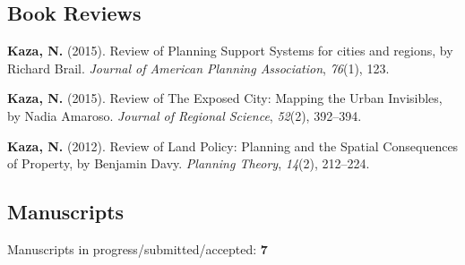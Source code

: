 \documentclass[11pt,a4paper,]{awesome-cv}
\newlength{\cslhangindent}
\newenvironment{CSLReferences}[2] %
 {\begin{list}{}{%
  \setlength{\itemindent}{0pt}
  \setlength{\leftmargin}{0pt}
  \setlength{\parsep}{0pt}
  \ifodd #1
   \setlength{\leftmargin}{\cslhangindent}
   \setlength{\itemindent}{-1\cslhangindent}
  \fi
  \setlength{\itemsep}{#2\baselineskip}}}
 {\end{list}}
\begin{document}
\subsection{Book Reviews}\label{book-reviews}

\label{refs-149dd9cfeca4d055441185fa490d5dbc}
\begin{CSLReferences}{1}{0}
\textbf{Kaza, N.} (2015). Review of Planning Support Systems for cities
and regions, by Richard Brail. \emph{Journal of American Planning
Association}, \emph{76}(1), 123.

\textbf{Kaza, N.} (2015). Review of The Exposed City: Mapping the Urban
Invisibles, by Nadia Amaroso. \emph{Journal of Regional Science},
\emph{52}(2), 392--394.

\textbf{Kaza, N.} (2012). Review of Land Policy: Planning and the
Spatial Consequences of Property, by Benjamin Davy. \emph{Planning
Theory}, \emph{14}(2), 212--224.

\end{CSLReferences}

\subsection{Manuscripts}\label{manuscripts}

Manuscripts in progress/submitted/accepted: \textbf{7}
\end{document}
